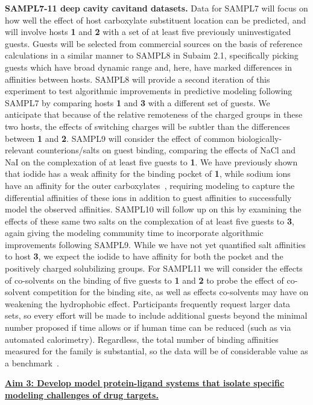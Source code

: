 \documentclass[11pt]{article}
\begin{document}
{\bf SAMPL7-11 deep cavity cavitand datasets.} 
Data for SAMPL7 will focus on how well the effect of host carboxylate substituent location can be predicted, and will involve hosts {\bf 1} and {\bf 2} with a set of at least five previously uninvestigated guests.  
Guests will be selected from commercial sources on the basis of reference calculations in a similar manner to SAMPL8 in Subaim 2.1, specifically picking guests which have broad dynamic range and, here, have marked differences in affinities between hosts.
SAMPL8 will provide a second iteration of this experiment to test algorithmic improvements in predictive modeling following SAMPL7 by comparing hosts {\bf 1} and {\bf 3} with a different set of guests.  
We anticipate that because of the relative remoteness of the charged groups in these two hosts, the effects of switching charges will be subtler than the differences between {\bf 1} and {\bf 2}.  
SAMPL9 will consider the effect of common biologically-relevant counterions/salts on guest binding, comparing the effects of NaCl and NaI on the complexation of at least five guests to {\bf 1}.  
We have previously shown that iodide has a weak affinity for the binding pocket of {\bf 1}, while sodium ions have an affinity for the outer carboxylates~\cite{carnegie_anion_2014}, requiring modeling to capture the differential affinities of these ions in addition to guest affinities to successfully model the observed affinities.  
SAMPL10 will follow up on this by examining the effects of these same two salts on the complexation of at least five guests to {\bf 3}, again giving the modeling community time to incorporate algorithmic improvements following SAMPL9. 
While we have not yet quantified salt affinities to host {\bf 3}, we expect the iodide to have affinity for both the pocket and the positively charged solubilizing groups.  
For SAMPL11 we will consider the effects of co-solvents on the binding of five guests to {\bf 1} and {\bf 2} to probe the effect of co-solvent competition for the binding site, as well as effects co-solvents may have on weakening the hydrophobic effect. 
Participants frequently request larger data sets, so every effort will be made to include additional guests beyond the minimal number proposed if time allows or if human time can be reduced (such as via automated calorimetry).
Regardless, the total number of binding affinities measured for the family is substantial, so the data will be of considerable value as a benchmark~\cite{Mobley:2017:AnnualReviewofBiophysics}. 


\textbf{\underline{Aim 3: Develop model protein-ligand systems that isolate specific modeling challenges of drug targets.}}
\end{document}
